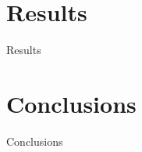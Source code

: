 \documentclass{beamer}
\begin{document}
\section{Results}

\begin{frame}	
	\begin{Huge}
		\begin{center}
			Results
		\end{center}
	\end{Huge}
\end{frame}


\section{Conclusions}

\begin{frame}	
	\begin{Huge}
		\begin{center}
			Conclusions
		\end{center}
	\end{Huge}
\end{frame}




\end{document}
